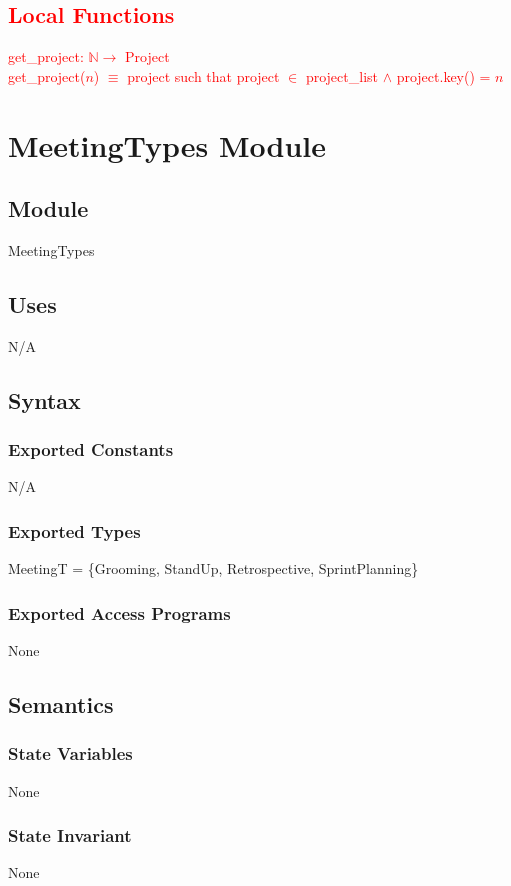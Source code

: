 \documentclass[12pt, titlepage]{article}
\begin{document}
\textcolor{red}{
\subsection*{Local Functions}
get\_project: $\mathbb{N} \rightarrow$ Project\\
get\_project($n$) $\equiv$ project such that project $\in$ project\_list $\land$ project.key() = $n$
}

\newpage

\section* {MeetingTypes Module}

\subsection* {Module}
MeetingTypes

\subsection*{Uses}
N/A

\subsection*{Syntax}
\subsubsection*{Exported Constants}
N/A

\subsubsection*{Exported Types}
MeetingT = \{Grooming, StandUp, Retrospective, SprintPlanning\}

\subsubsection*{Exported Access Programs}
None

\subsection*{Semantics}
\subsubsection* {State Variables}
None

\subsubsection* {State Invariant}
None
\end{document}
